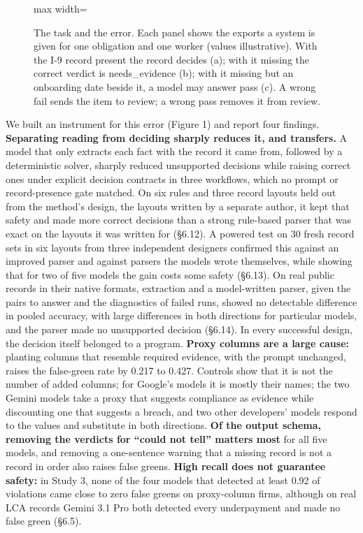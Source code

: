 \documentclass[10pt,twocolumn]{article}
\begin{document}
\begin{figure}[t]\centering
\begin{adjustbox}{max width=\textwidth}\end{adjustbox}
\caption{The task and the error. Each panel shows the exports a system is given for one obligation and one worker (values illustrative). With the I-9 record present the record decides (a); with it missing the correct verdict is needs\_evidence (b); with it missing but an onboarding date beside it, a model may answer pass (c). A wrong fail sends the item to review; a wrong pass removes it from review. }\label{fig:fig_overview}
\end{figure}

We built an instrument for this error (Figure 1) and report four findings. \textbf{Separating reading from deciding sharply reduces it, and transfers.} A model that only extracts each fact with the record it came from, followed by a deterministic solver, sharply reduced unsupported decisions while raising correct ones under explicit decision contracts in three workflows, which no prompt or record-presence gate matched. On six rules and three record layouts held out from the method's design, the layouts written by a separate author, it kept that safety and made more correct decisions than a strong rule-based parser that was exact on the layouts it was written for (§6.12). A powered test on 30 fresh record sets in six layouts from three independent designers confirmed this against an improved parser and against parsers the models wrote themselves, while showing that for two of five models the gain costs some safety (§6.13). On real public records in their native formats, extraction and a model-written parser, given the pairs to answer and the diagnostics of failed runs, showed no detectable difference in pooled accuracy, with large differences in both directions for particular models, and the parser made no unsupported decision (§6.14). In every successful design, the decision itself belonged to a program. \textbf{Proxy columns are a large cause:} planting columns that resemble required evidence, with the prompt unchanged, raises the false-green rate by 0.217 to 0.427. Controls show that it is not the number of added columns; for Google's models it is mostly their names; the two Gemini models take a proxy that suggests compliance as evidence while discounting one that suggests a breach, and two other developers' models respond to the values and substitute in both directions. \textbf{Of the output schema, removing the verdicts for ``could not tell'' matters most} for all five models, and removing a one-sentence warning that a missing record is not a record in order also raises false greens. \textbf{High recall does not guarantee safety:} in Study 3, none of the four models that detected at least 0.92 of violations came close to zero false greens on proxy-column firms, although on real LCA records Gemini 3.1 Pro both detected every underpayment and made no false green (§6.5).
\end{document}
